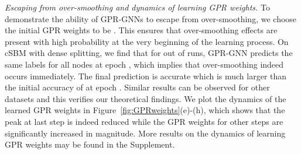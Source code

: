 \documentclass{article} \usepackage{iclr2021_conference,times}
\begin{document}
\emph{Escaping from over-smoothing and dynamics of learning GPR weights. } To demonstrate the ability of GPR-GNNs to escape from over-smoothing, we choose the initial GPR weights to be . This ensures that over-smoothing effects are present with high probability at the very beginning of the learning process. On cSBM with dense splitting, we find that for  out of  runs, GPR-GNN predicts the same labels for all nodes at epoch , which implies that over-smoothing indeed occurs immediately. The final prediction is  accurate which is much larger than the initial accuracy of  at epoch . Similar results can be observed for other datasets and this verifies our theoretical findings. We plot the dynamics of the learned GPR weights in Figure~\ref{fig:GPRweights}(e)-(h), which shows that the peak at last step is indeed reduced while the GPR weights for other steps are significantly increased in magnitude. More results on the dynamics of learning GPR weights may be found in the Supplement.
\end{document}
